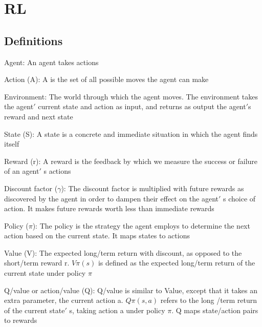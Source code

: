 \chapter{RL}
\label{cha:Ref3}

\section{Definitions}
\begin{description}
\begin{item}Agent: An agent takes actions\end{item}

\begin{item}Action (A): A is the set of all possible moves the agent can make\end{item}

\begin{item}Environment: The world through which the agent moves. The environment takes the agent$\prime$ current state and action as input, and returns as output the agent$\prime$s reward and next state\end{item}

\begin{item}State (S): A state is a concrete and immediate situation in which the agent finds itself\end{item}

\begin{item}Reward (r): A reward is the feedback by which we measure the success or failure of an agent$\prime$ s actions\end{item}

\begin{item}Discount factor ($\gamma$): The discount factor is multiplied with future rewards as discovered by the agent in order to dampen their effect on the agent$\prime$ s choice of action. It makes future rewards worth less than immediate rewards \end{item}

\begin{item}Policy ($\pi$): The policy is the strategy the agent employs to determine the next action based on the current state. It maps states to actions\end{item}

\begin{item}Value (V): The expected long\-/term return with discount, as opposed to the short\-/term reward r. $V\pi(s)$ is defined as the expected long\-/term return of the current state under policy $\pi$ \end{item}

\begin{item} Q\-/value or action\-/value (Q): Q\-/value is similar to Value, except that it takes an extra parameter, the current action a. $Q\pi(s,a)$ refers to the long \-/term return of the current state$\prime$ s, taking action a under policy $\pi$. Q maps state\-/action pairs to rewards\end{item}
\end{description}

